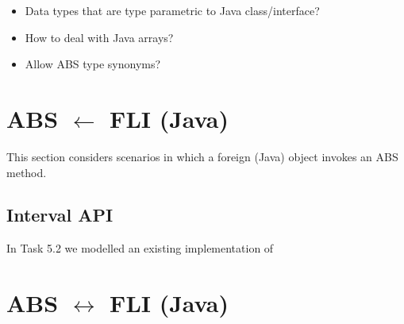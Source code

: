 \documentclass[a4paper,11pt,final]{article}
\begin{document}
\begin{itemize}
  \item Data types that are type parametric to Java class/interface?
  \item How to deal with Java arrays?
  \item Allow ABS type synonyms? 
\end{itemize}

\section{ABS $\leftarrow$ FLI (Java)}
This section considers scenarios in which a foreign (Java) object invokes an
ABS method.

\subsection{Interval API}
In Task 5.2 we modelled an existing implementation of 


\section{ABS $\leftrightarrow$ FLI (Java)}
\end{document}
